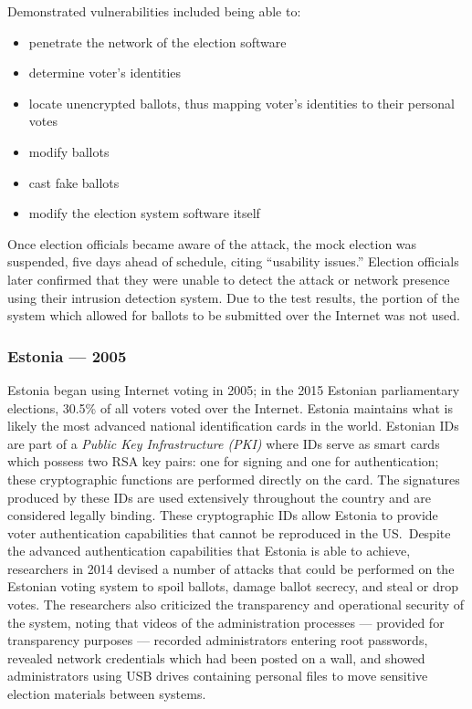 Demonstrated vulnerabilities included being able to:
\begin{itemize}
  \item penetrate the network of the election software
  \item determine voter's identities
  \item locate unencrypted ballots, thus mapping voter's identities to their
    personal votes
  \item modify ballots
  \item cast fake ballots
  \item modify the election system software itself
\end{itemize}

Once election officials became aware of the attack, the mock election was
suspended, five days ahead of schedule, citing ``usability issues.'' Election
officials later confirmed that they were unable to detect the attack or network
presence using their intrusion detection system. Due to the test results, the
portion of the system which allowed for ballots to be submitted over the
Internet was not used.\cite{dc-voting-system}

\subsubsection{Estonia --- 2005}
Estonia began using Internet voting in 2005\cite{internet-voting-survey}; in the
2015 Estonian parliamentary elections, 30.5\% of all voters voted over the
Internet. Estonia maintains what is likely the most advanced national
identification cards in the world. Estonian IDs are part of a \emph{Public Key
Infrastructure (PKI)} where IDs serve as smart cards which possess two RSA key
pairs: one for signing and one for authentication; these cryptographic functions
are performed directly on the card. The signatures produced by these IDs are
used extensively throughout the country and are considered legally binding.
These cryptographic IDs allow Estonia to provide voter authentication
capabilities that cannot be reproduced in the US.\ Despite the advanced
authentication capabilities that Estonia is able to achieve, researchers in 2014
devised a number of attacks that could be performed on the Estonian voting
system to spoil ballots, damage ballot secrecy, and steal or drop votes. The
researchers also criticized the transparency and operational security of the
system, noting that videos of the administration processes --- provided for
transparency purposes --- recorded administrators entering root passwords,
revealed network credentials which had been posted on a wall, and showed
administrators using USB drives containing personal files to move sensitive
election materials between systems.\cite{estonia}

